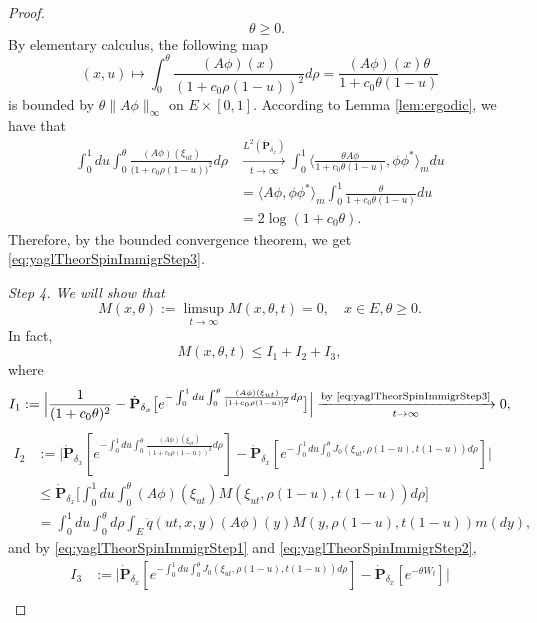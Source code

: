 \documentclass[UTF8]{pkuthss}
\theoremstyle{plain}
\theoremstyle{definition}
\numberwithin{equation}{section}
\begin{document}
\begin{proof}
\begin{equation}
	\quad \theta\geq 0.
\end{equation}
	By elementary calculus, the following map
\[
	(x,u)
	\mapsto\int_0^\theta \frac{ (A\phi)(x)}{(1+c_0\rho(1-u))^2} d\rho
	= \frac{ (A\phi)(x)\theta}{1+c_0\theta(1-u)}
\]
	is bounded by $\theta\| A\phi\|_\infty$ on $E\times[0,1]$.
	According to Lemma \ref{lem:ergodic}, we have that
\[\begin{split}
	\int_0^1 du \int_0^\theta \frac{ (A\phi)(\xi_{ut})}{\big(1+c_0\rho(1-u)\big)^2} d\rho
	&\xrightarrow[t\to\infty]{L^2(\dot{\mathbf P}_{\delta_x})} \int_0^1 \big\langle \frac{\theta A\phi}{1+c_0\theta(1-u)},\phi\phi^* \big\rangle_m du\\
	&= \langle  A\phi,\phi\phi^*\rangle_m\int_0^1 \frac{\theta}{1+c_0\theta(1-u)}du \\
	&=2\log(1+c_0\theta).
\end{split}\]
	Therefore, by the bounded convergence theorem, we get \eqref{eq:yaglTheorSpinImmigrStep3}.
\par
	\emph{Step 4. We will show that}
\begin{equation}\label{eq:yaglTheorSpinImmigrStep4}
	M(x,\theta)
	:=\limsup_{t\to\infty}M(x,\theta,t)=0,
	\quad x\in E,\theta\geq 0.
\end{equation}
	In fact,
\begin{equation}\label{eq:separate-M-into-3-parts}
	M(x,\theta,t)
	\leq I_1+I_2+I_3,
\end{equation}
	where
\[
	I_1
	:=\Big|\frac{1}{(1+c_0\theta)^2}- \dot {\mathbf P}_{\delta_x} \big[e^{- \int_0^1 du \int_0^\theta \frac{ (A\phi)(\xi_{ut})}{[1+c_0\rho(1-u)]^2}d\rho }\big]\Big|
	\xrightarrow[t\to\infty]{\text{by \eqref{eq:yaglTheorSpinImmigrStep3}}} 0,
\]
\[\begin{split}
	I_2
	&:=\Big| \dot {\mathbf P}_{\delta_x} [e^{- \int_0^1 du \int_0^\theta  \frac{ (A\phi)(\xi_{ut})}{(1+c_0\rho(1-u))^2} d\rho}]-\dot{\mathbf P}_{\delta_x}[e^{-\int_0^1 du\int_0^{\theta} J_0(\xi_{ut},\rho(1-u),t(1-u)) d\rho}]\Big|\\
	&\leq\dot{\mathbf P}_{\delta_x}\Big[\int_0^1du\int_0^\theta (A\phi)(\xi_{ut})M(\xi_{ut},\rho(1-u),t(1-u))d\rho \Big]\\
	&=\int_0^1du\int_0^\theta d\rho \int_{E} \dot{q}(ut,x,y) (A\phi)(y)M(y,\rho(1-u),t(1-u)) m(dy),
\end{split}\]
	and by \eqref{eq:yaglTheorSpinImmigrStep1} and \eqref{eq:yaglTheorSpinImmigrStep2},
\[\begin{split}
	I_3
	&:=\big|\dot{\mathbf P}_{\delta_x}[e^{-\int_0^1 du\int_0^{\theta} J_0(\xi_{ut},\rho(1-u),t(1-u)) d\rho }]-\dot{\mathbf P}_{\delta_x}[e^{-\theta W_t}]\big|\\

\end{split}\]
\end{proof}
\end{document}
